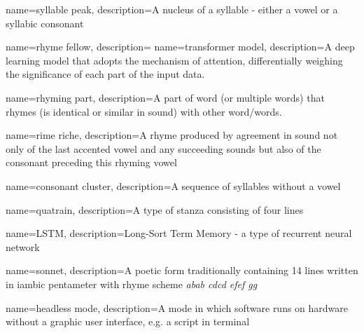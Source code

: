 
{
	name=syllable peak,
	description={A nucleus of a syllable - either a vowel or a syllabic consonant}
}

{
	name=rhyme fellow,
	description={}
}
{
	name=transformer model,
	description={A deep learning model that adopts the mechanism of attention, differentially weighing the significance of each part of the input data.}
}

{
	name=rhyming part,
	description={A part of word (or multiple words) that rhymes (is identical or similar in sound) with other word/words.}
}


{
	name=rime riche,
	description={A rhyme produced by agreement in sound not only of the last accented vowel and any succeeding sounds but also of the consonant preceding this rhyming vowel}
}


{
	name=consonant cluster,
	description={A sequence of syllables without a vowel}
}

{
	name=quatrain,
	description={A type of stanza consisting of four lines}
}

{
	name=LSTM,
	description={Long-Sort Term Memory - a type of recurrent neural network}
}

{
	name=sonnet,
	description={A poetic form traditionally containing 14 lines written in iambic pentameter with rhyme scheme \textit{abab cdcd efef gg}}
}

{
	name=headless mode,
	description={A mode in which software runs on hardware without a graphic user interface, e.g. a script in terminal}
}
